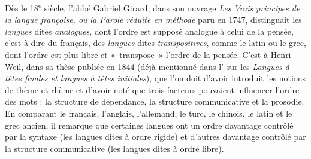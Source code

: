 {    Dès le 18\textsuperscript{e} siècle, l’abbé Gabriel Girard, dans son ouvrage \textit{Les Vrais principes de la langue françoise, ou la Parole réduite en méthode} paru en 1747, distinguait les \textit{langues} dites \textit{analogues}, dont l’ordre est supposé analogue à celui de la pensée, c’est-à-dire du français, des \textit{langues} dites \textit{transpositives}, comme le latin ou le grec, dont l’ordre est plus libre et «~transpose~» l’ordre de la pensée. C’est à Henri Weil, dans sa thèse publiée en 1844 (déjà mentionné dans l’ sur les \textit{Langues à têtes finales et langues à têtes initiales}), que l’on doit d’avoir introduit les notions de thème et rhème et d’avoir noté que trois facteurs pouvaient influencer l’ordre des mots : la structure de dépendance, la structure communicative et la prosodie. En comparant le français, l’anglais, l’allemand, le turc, le chinois, le latin et le grec ancien, il remarque que certaines langues ont un ordre davantage contrôlé par la syntaxe (les langues dites à ordre rigide) et d’autres davantage contrôlé par la structure communicative (les langues dites à ordre libre).
}

